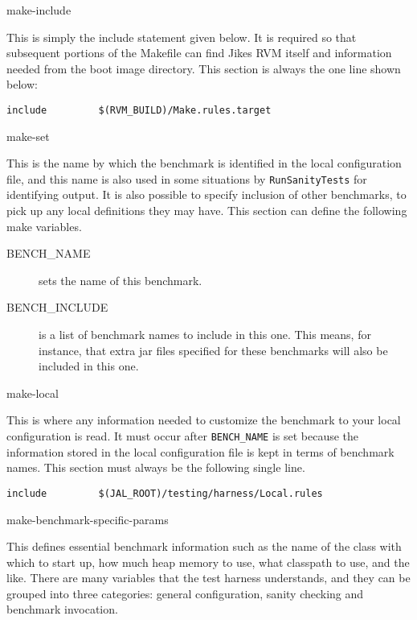 \begin{description}
\begin{Label}{make-include}
\item[Include the environment rules from the current build directory]
This is simply the include statement given below.  It is required so
that subsequent portions of the Makefile can find Jikes RVM itself
and information needed from the boot image directory.  This section
is always the one line shown below:
\begin{verbatim}
include         $(RVM_BUILD)/Make.rules.target
\end{verbatim}
\end{Label}

\begin{Label}{make-set}
\item[Set the benchmark name]
This is the name by which the benchmark
is identified in the local configuration file, and this name is also
used in some situations by {\tt{RunSanityTests}} for identifying
output.  It is also possible to specify inclusion of other benchmarks,
to pick up any local definitions they may have.  This section can
define the following make variables.
\begin{description}
\item[BENCH\_NAME] sets the name of this benchmark.  
\item[BENCH\_INCLUDE] is a list of benchmark names to include in this
one.  This means, for instance, that extra jar files specified for
these benchmarks will also be included in this one.
\end{description}
\end{Label}


\begin{Label}{make-local}
\item[Include local configuration information, if needed]
This is
where any information needed to customize the benchmark to your local
configuration is read.  It must occur after {\tt{BENCH\_NAME}} is set
because the information stored in the local configuration file is kept
in terms of benchmark names.  This section must always be the
following single line.
\begin{verbatim}
include         $(JAL_ROOT)/testing/harness/Local.rules
\end{verbatim}
\end{Label}


\begin{Label}{make-benchmark-specific-params}
\item[Define benchmark-specific parameters]
  This defines essential
benchmark information such as the name of the class with which to
start up, how much heap memory to use, what classpath to use, and the
like.  There are many variables that the test harness understands, and
they can be grouped into three categories: general configuration,
sanity checking and benchmark invocation.


\end{Label}
\end{description}
